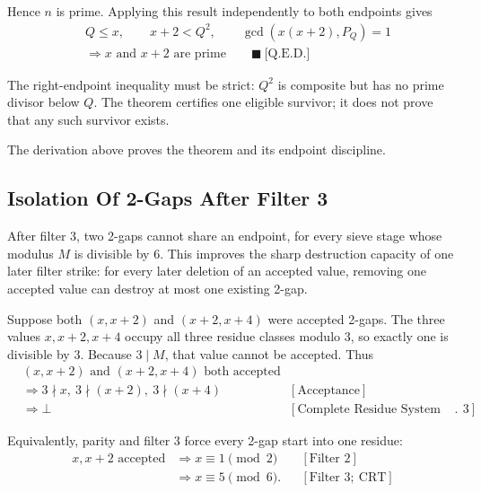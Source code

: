Hence $n$ is prime. Applying this result independently to both endpoints gives
\begin{equation*}
\begin{aligned}
& Q\le x,\qquad x+2\lt Q^2,\qquad \gcd(x(x+2),P_Q)=1\\
&\Longrightarrow x\text{ and }x+2\text{ are prime}
\qquad\blacksquare\ \text{[Q.E.D.]}
\end{aligned}
\end{equation*}

The right-endpoint inequality must be strict: $Q^2$ is composite but has no
prime divisor below $Q$. The theorem certifies one eligible survivor; it does
not prove that any such survivor exists.

{\raggedright
The derivation above proves the theorem and its endpoint discipline.
\par}

\subsection{Isolation Of 2-Gaps After Filter 3}
\label{sec:two-gap-isolation}

After filter $3$, two 2-gaps cannot share an endpoint, for every sieve stage
whose modulus $M$ is divisible by $6$. This improves the sharp destruction
capacity of one later filter strike: for every later deletion of an accepted
value, removing one accepted value can destroy at most one existing 2-gap.

Suppose both $(x,x+2)$ and $(x+2,x+4)$ were accepted 2-gaps. The three values
$x,x+2,x+4$ occupy all three residue classes modulo $3$, so exactly one is
divisible by $3$. Because $3\mid M$, that value cannot be accepted. Thus
\begin{equation*}
\begin{aligned}
& (x,x+2)\text{ and }(x+2,x+4)\text{ both accepted}\\
&\Longrightarrow 3\nmid x,\ 3\nmid(x+2),\ 3\nmid(x+4)
&&[\text{Acceptance}]\\
&\Longrightarrow \bot
&&[\text{Complete Residue System Modulo }3].
\end{aligned}
\end{equation*}

Equivalently, parity and filter $3$ force every 2-gap start into one residue:
\begin{equation*}
\begin{aligned}
x,x+2\text{ accepted}
&\Longrightarrow x\equiv1\pmod2
&&[\text{Filter }2]\\
&\Longrightarrow x\equiv5\pmod6.
&&[\text{Filter }3;\ \text{CRT}]
\end{aligned}
\end{equation*}

